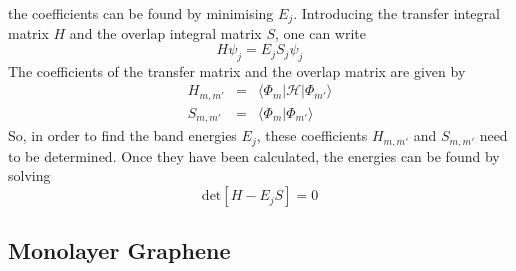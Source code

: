 the coefficients can be found by minimising $E_j$. Introducing the transfer integral matrix $H$ and the overlap integral matrix $S$, one can write
\begin{equation}
H \psi_j =  E_j S_j \psi_j
\end{equation}
The coefficients of the transfer matrix and the overlap matrix are given by
\begin{eqnarray}
H_{m, m'} &=& \langle \Phi_m | \mathcal{H} | \Phi_{m'} \rangle \\
S_{m, m'} &=& \langle \Phi_m | \Phi_{m'}\rangle
\end{eqnarray}
So, in order to find the band energies $E_j$, these coefficients $H_{m, m'}$ and $S_{m, m'}$ need to be determined. Once they have been calculated, the energies can be found by solving
\begin{equation}
\text{det} \left[ H - E_j S \right] = 0
\end{equation}

\subsection{Monolayer Graphene}

